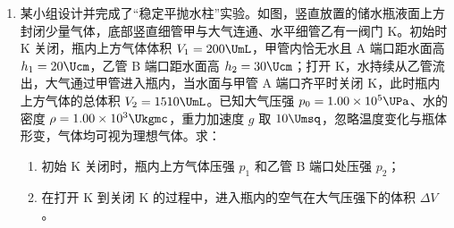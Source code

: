 \documentclass[\gkver]{gaokaozhenti}
\begin{document}
\begin{enumerate}
{两式相乘可消去 $R_{a}$ 和 $R_{bc}$，解得 $R_{x}=\sqrt{R_{1}R_{2}}$，

故选 A。

②由上述分析可知 $R_{x}=\sqrt{R_{1}R_{2}}$。
}

\item
某小组设计并完成了“稳定平抛水柱”实验。如图，竖直放置的储水瓶液面上方封闭少量气体，底部竖直细管甲与大气连通、水平细管乙有一阀门 K。初始时 K 关闭，瓶内上方气体体积 $V_{1}=200\UmL$，甲管内恰无水且 A 端口距水面高 $h_{1}=20\Ucm$，乙管 B 端口距水面高 $h_{2}=30\Ucm$；打开 K，水持续从乙管流出，大气通过甲管进入瓶内，当水面与甲管 A 端口齐平时关闭 K，此时瓶内上方气体的总体积 $V_{2}=1510\UmL$。已知大气压强 $p_{0}=1.00\times10^{5}\UPa$、水的密度 $\rho=1.00\times10^{3}\Ukgmc$，重力加速度 $g$ 取 $10\Umsq$，忽略温度变化与瓶体形变，气体均可视为理想气体。求：
\begin{enumerate}
	\item
	初始 K 关闭时，瓶内上方气体压强 $p_{1}$ 和乙管 B 端口处压强 $p_{2}$；
	\item
	在打开 K 到关闭 K 的过程中，进入瓶内的空气在大气压强下的体积 $\Delta V$。
\end{enumerate}
\onepicture[h=6.0cm, align=right]{}

\end{enumerate}
\end{document}
